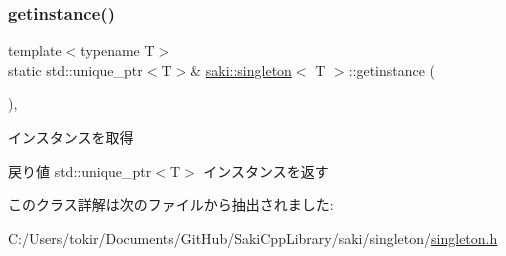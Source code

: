 \subsubsection{\texorpdfstring{getinstance()}{getinstance()}}
{\footnotesize\ttfamily template$<$typename T$>$ \\
static std\+::unique\+\_\+ptr$<$T$>$\& \mbox{\hyperlink{classsaki_1_1singleton}{saki\+::singleton}}$<$ T $>$\+::getinstance (\begin{DoxyParamCaption}{ }\end{DoxyParamCaption})\hspace{0.3cm}{\ttfamily [inline]}, {\ttfamily [static]}}



インスタンスを取得 

\begin{DoxyReturn}{戻り値}
std\+::unique\+\_\+ptr$<$\+T$>$ インスタンスを返す 
\end{DoxyReturn}


このクラス詳解は次のファイルから抽出されました\+:\begin{DoxyCompactItemize}
\item 
C\+:/\+Users/tokir/\+Documents/\+Git\+Hub/\+Saki\+Cpp\+Library/saki/singleton/\mbox{\hyperlink{singleton_8h}{singleton.\+h}}\end{DoxyCompactItemize}

